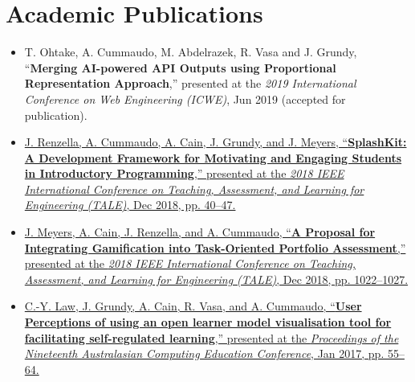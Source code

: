 \section{Academic Publications}

{
\small
\begin{itemize}
  \item T. Ohtake, A. Cummaudo, M. Abdelrazek, R. Vasa and J. Grundy, ``\textbf{Merging AI-powered API Outputs using Proportional Representation Approach},'' presented at the \textit{2019 International Conference on Web Engineering (ICWE)}, Jun 2019 (accepted for publication).
  \item \href{http://doi.org/10.1109/TALE.2018.8615203}{J. Renzella, A. Cummaudo, A. Cain, J. Grundy, and J. Meyers, ``\textbf{SplashKit: A Development Framework for Motivating and Engaging Students in Introductory Programming},'' presented at the \textit{2018 IEEE International Conference on Teaching, Assessment, and Learning for Engineering (TALE)}, Dec 2018, pp. 40–47.}
  \item \href{http://doi.org/10.1109/TALE.2018.8615174}{J. Meyers, A. Cain, J. Renzella, and A. Cummaudo, ``\textbf{A Proposal for Integrating Gamification into Task-Oriented Portfolio Assessment},'' presented at the \textit{2018 IEEE International Conference on Teaching, Assessment, and Learning for Engineering (TALE)}, Dec 2018, pp. 1022–1027.}
  \item \href{http://doi.org/10.1145/3013499.3013502}{C.-Y. Law, J. Grundy, A. Cain, R. Vasa, and A. Cummaudo, ``\textbf{User Perceptions of using an open learner model visualisation tool for facilitating self-regulated learning},'' presented at the \textit{Proceedings of the Nineteenth Australasian Computing Education Conference}, Jan 2017, pp. 55–64.}
\end{itemize}
}

%
%
%  
